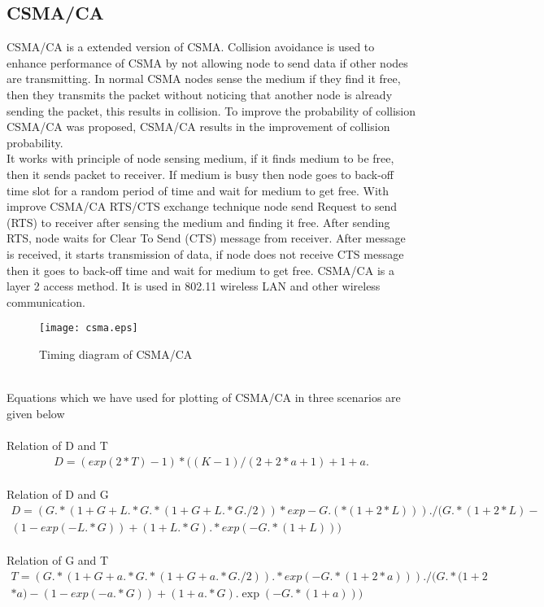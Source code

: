 \documentclass[11pt, conference, compsocconf, onecolumn]{IEEEtran}
\begin{document}
\subsection{CSMA/CA}
CSMA/CA is a extended version of CSMA. Collision avoidance is used to enhance performance of CSMA by not allowing node to send data if other nodes are transmitting. In normal CSMA nodes sense the medium if they find it free, then they transmits the packet without noticing that another node is already sending the packet, this results in collision. To improve the probability of collision CSMA/CA was proposed, CSMA/CA results in the improvement of collision probability.\\
\indent It works with principle of node sensing medium, if it finds medium to be free, then it sends packet to receiver. If medium is busy then node goes to back-off time slot for a random period of time and wait for medium to get free. With improve CSMA/CA RTS/CTS exchange technique node send Request to send (RTS) to receiver after sensing the medium and finding it free. After sending RTS, node waits
for Clear To Send (CTS) message from receiver. After message is received, it starts transmission of data, if node does not receive CTS message
then it goes to back-off time and wait for medium to get free. CSMA/CA is a layer 2 access method.  It is used in 802.11 wireless LAN and other wireless communication.
\begin{figure}[!h]
\centering
\caption{Timing diagram of CSMA/CA}
\texttt{[image: csma.eps]}
\end{figure}
\\
Equations which we have used for plotting of CSMA/CA in three scenarios are given below
\\\\
Relation of D and T
\begin{eqnarray}
D=(exp(2*T)-1)*((K-1)/(2+2*a+1)+1+a.
\end{eqnarray}
\\
Relation of D and G
\begin{eqnarray}
D=(G.*(1+G+L.*G.*(1+G+L.*G./2))*exp-G.(*(1+2*L)))./(G.*(1+2*L)-\nonumber\\
(1-exp(-L.*G))+(1+L.*G).*exp(-G.*(1+L)))
\end{eqnarray}
\\
Relation of G and T
\begin{eqnarray}
T=(G.*(1+G+a.*G.*(1+G+a.*G./2)).*exp(-G.*(1+2*a)))./(G.*(1+2  \nonumber\\
*a)-(1-exp(-a.*G))+(1+a.*G). \exp(-G.*(1+a)))
\end{eqnarray}
\end{document}
